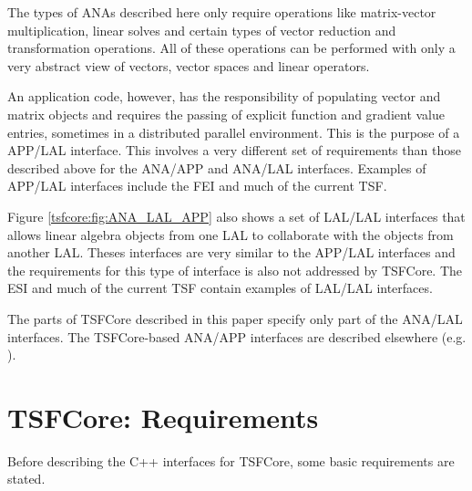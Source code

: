 The types of ANAs described here only require operations like
matrix-vector multiplication, linear solves and certain types of
vector reduction and transformation operations.  All of these
operations can be performed with only a very abstract view of vectors,
vector spaces and linear operators.

An application code, however, has the responsibility of populating
vector and matrix objects and requires the passing of explicit
function and gradient value entries, sometimes in a distributed
parallel environment.  This is the purpose of a APP/LAL interface.
This involves a very different set of requirements than those
described above for the ANA/APP and ANA/LAL interfaces.  Examples of
APP/LAL interfaces include the FEI \cite{ref:fei} and much of the
current TSF.

Figure \ref{tsfcore:fig:ANA_LAL_APP} also shows a set of LAL/LAL
interfaces that allows linear algebra objects from one LAL to
collaborate with the objects from another LAL.  Theses interfaces are
very similar to the APP/LAL interfaces and the requirements for this
type of interface is also not addressed by TSFCore.  The ESI
\cite{ref:esi_2001} and much of the current TSF contain examples of
LAL/LAL interfaces.

The parts of TSFCore described in this paper specify only part of the
ANA/LAL interfaces.  The TSFCore-based ANA/APP interfaces are
described elsewhere (e.g. \cite{ref:TSFCore::Nonlin}).

%
\section{TSFCore: Requirements}
\label{tsfcore:sec:TSFCore_requirements}
%

Before describing the C++ interfaces for TSFCore, some basic
requirements are stated.

